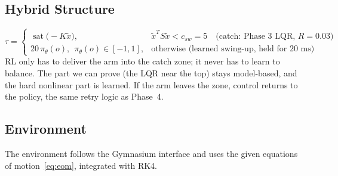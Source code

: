 \documentclass[12pt,a4paper]{article}
\begin{document}
\subsection{Hybrid Structure}
\begin{equation}
\tau=\begin{cases}\operatorname{sat}\big(-K\tilde x\big), & \tilde x^TS\tilde x<c_{sw}=5\quad\text{(catch: Phase 3 LQR, } R=0.03\text{)}\\[2pt] 20\,\pi_\theta(o),\ \ \pi_\theta(o)\in[-1,1], & \text{otherwise (learned swing-up, held for 20 ms)}\end{cases}
\end{equation}
RL only has to deliver the arm into the catch zone; it never has to learn to balance. The part we can prove (the LQR near the top) stays model-based, and the hard nonlinear part is learned. If the arm leaves the zone, control returns to the policy, the same retry logic as Phase~4.

\subsection{Environment}
The environment follows the Gymnasium interface and uses the given equations of motion~\eqref{eq:eom}, integrated with RK4.
\begin{table}[H]
\centering
\caption{RL environment}
\label{tab:env}
\end{table}
\end{document}
